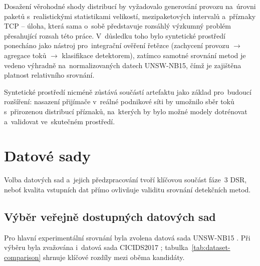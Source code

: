 Dosažení věrohodné shody distribucí by vyžadovalo generování provozu na~úrovni paketů s~realistickými statistikami velikostí, mezipaketových intervalů a~příznaky TCP -- úloha, která sama o~sobě představuje rozsáhlý výzkumný problém přesahující rozsah této práce. V~důsledku toho bylo syntetické prostředí ponecháno jako nástroj pro~integrační ověření řetězce (zachycení provozu $\rightarrow$ agregace toků $\rightarrow$ klasifikace detektorem), zatímco samotné srovnání metod je vedeno výhradně na~normalizovaných datech UNSW-NB15, čímž je zajištěna platnost relativního srovnání.

Syntetické prostředí nicméně zůstává součástí artefaktu jako základ pro~budoucí rozšíření: nasazení přijímače v~reálné podnikové síti by umožnilo sběr toků s~přirozenou distribucí příznaků, na~kterých by bylo možné modely dotrénovat a~validovat ve~skutečném prostředí.

\section{Datové sady}
\label{sec:datove-sady}

Volba datových sad a~jejich předzpracování tvoří klíčovou součást fáze~3 DSR, neboť kvalita vstupních dat přímo ovlivňuje validitu srovnání detekčních metod.

\subsection{Výběr veřejně dostupných datových sad}
\label{sec:vyber-datasetu}

Pro hlavní experimentální srovnání byla zvolena datová sada UNSW-NB15 \parencite{Moustafa2015}. Při výběru byla zvažována i~datová sada CICIDS2017 \parencite{Sharafaldin2018}; tabulka~\ref{tab:dataset-comparison} shrnuje klíčové rozdíly mezi oběma kandidáty.

